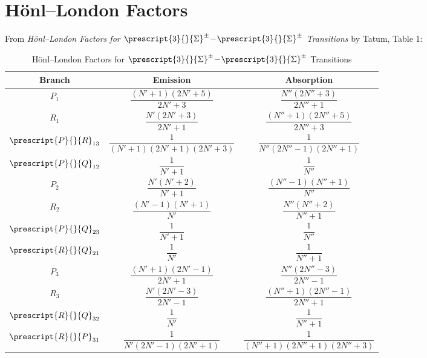 \documentclass[11pt, twoside, fleqn]{report}
\newcommand{\dash}{\!-\!}
\newcommand{\state}[2]{\prescript{#1}{}{#2}}
\begin{document}
\section{H\"onl--London Factors}

From \textit{H\"onl--London Factors for $\state{3}{\Sigma}^\pm\dash\state{3}{\Sigma}^\pm$ Transitions} by Tatum, Table 1:
\begin{table}[H]
    \centering
    \caption{H\"onl--London Factors for $\state{3}{\Sigma}^\pm\dash\state{3}{\Sigma}^\pm$ Transitions}
    \begin{tabular}{ccc}
        \toprule
        Branch              & Emission                                & Absorption                                 \\
        \midrule
        $P_1$               & $\dfrac{(N' + 1)(2N' + 5)}{2N' + 3}$    & $\dfrac{N''(2N'' + 3)}{2N'' + 1}$          \\
        \addlinespace[0.5em]
        $R_1$               & $\dfrac{N'(2N' + 3)}{2N' + 1}$          & $\dfrac{(N'' + 1)(2N'' + 5)}{2N'' + 3}$    \\
        \addlinespace[0.5em]
        $\state{P}{R}_{13}$ & $\dfrac{1}{(N' + 1)(2N' + 1)(2N' + 3)}$ & $\dfrac{1}{N''(2N'' - 1)(2N'' + 1)}$       \\
        \addlinespace[0.5em]
        $\state{P}{Q}_{12}$ & $\dfrac{1}{N' + 1}$                     & $\dfrac{1}{N''}$                           \\
        \addlinespace[0.5em]
        $P_2$               & $\dfrac{N'(N' + 2)}{N' + 1}$            & $\dfrac{(N'' - 1)(N'' + 1)}{N''}$          \\
        \addlinespace[0.5em]
        $R_2$               & $\dfrac{(N' - 1)(N' + 1)}{N'}$          & $\dfrac{N''(N'' + 2)}{N'' + 1}$            \\
        \addlinespace[0.5em]
        $\state{P}{Q}_{23}$ & $\dfrac{1}{N' + 1}$                     & $\dfrac{1}{N''}$                           \\
        \addlinespace[0.5em]
        $\state{R}{Q}_{21}$ & $\dfrac{1}{N'}$                         & $\dfrac{1}{N'' + 1}$                       \\
        \addlinespace[0.5em]
        $P_3$               & $\dfrac{(N' + 1)(2N' - 1)}{2N' + 1}$    & $\dfrac{N''(2N'' - 3)}{2N'' - 1}$          \\
        \addlinespace[0.5em]
        $R_3$               & $\dfrac{N'(2N' - 3)}{2N' - 1}$          & $\dfrac{(N'' + 1)(2N'' - 1)}{2N'' + 1}$    \\
        \addlinespace[0.5em]
        $\state{R}{Q}_{32}$ & $\dfrac{1}{N'}$                         & $\dfrac{1}{N'' + 1}$                       \\
        \addlinespace[0.5em]
        $\state{R}{P}_{31}$ & $\dfrac{1}{N'(2N' - 1)(2N' + 1)}$       & $\dfrac{1}{(N'' + 1)(2N'' + 1)(2N'' + 3)}$ \\
        \bottomrule
    \end{tabular}
\end{table}
\end{document}
